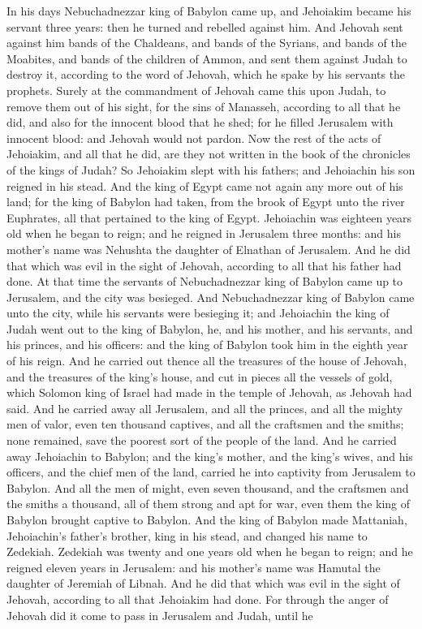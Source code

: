 In his days Nebuchadnezzar king of Babylon came up, and Jehoiakim became his servant three years: then he turned and rebelled against him. And Jehovah sent against him bands of the Chaldeans, and bands of the Syrians, and bands of the Moabites, and bands of the children of Ammon, and sent them against Judah to destroy it, according to the word of Jehovah, which he spake by his servants the prophets. Surely at the commandment of Jehovah came this upon Judah, to remove them out of his sight, for the sins of Manasseh, according to all that he did, and also for the innocent blood that he shed; for he filled Jerusalem with innocent blood: and Jehovah would not pardon. Now the rest of the acts of Jehoiakim, and all that he did, are they not written in the book of the chronicles of the kings of Judah? So Jehoiakim slept with his fathers; and Jehoiachin his son reigned in his stead. And the king of Egypt came not again any more out of his land; for the king of Babylon had taken, from the brook of Egypt unto the river Euphrates, all that pertained to the king of Egypt.  Jehoiachin was eighteen years old when he began to reign; and he reigned in Jerusalem three months: and his mother’s name was Nehushta the daughter of Elnathan of Jerusalem. And he did that which was evil in the sight of Jehovah, according to all that his father had done.  At that time the servants of Nebuchadnezzar king of Babylon came up to Jerusalem, and the city was besieged. And Nebuchadnezzar king of Babylon came unto the city, while his servants were besieging it; and Jehoiachin the king of Judah went out to the king of Babylon, he, and his mother, and his servants, and his princes, and his officers: and the king of Babylon took him in the eighth year of his reign. And he carried out thence all the treasures of the house of Jehovah, and the treasures of the king’s house, and cut in pieces all the vessels of gold, which Solomon king of Israel had made in the temple of Jehovah, as Jehovah had said. And he carried away all Jerusalem, and all the princes, and all the mighty men of valor, even ten thousand captives, and all the craftsmen and the smiths; none remained, save the poorest sort of the people of the land. And he carried away Jehoiachin to Babylon; and the king’s mother, and the king’s wives, and his officers, and the chief men of the land, carried he into captivity from Jerusalem to Babylon. And all the men of might, even seven thousand, and the craftsmen and the smiths a thousand, all of them strong and apt for war, even them the king of Babylon brought captive to Babylon. And the king of Babylon made Mattaniah, Jehoiachin’s father’s brother, king in his stead, and changed his name to Zedekiah.  Zedekiah was twenty and one years old when he began to reign; and he reigned eleven years in Jerusalem: and his mother’s name was Hamutal the daughter of Jeremiah of Libnah. And he did that which was evil in the sight of Jehovah, according to all that Jehoiakim had done. For through the anger of Jehovah did it come to pass in Jerusalem and Judah, until he 
